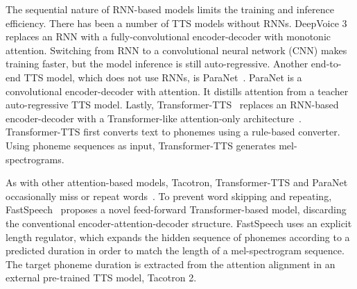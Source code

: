 The sequential nature of RNN-based models limits the training and inference efficiency. There has been a number of TTS models without RNNs. DeepVoice 3~\cite{deepvoice3} replaces an RNN with a fully-convolutional encoder-decoder with monotonic attention. Switching from RNN to a convolutional neural network (CNN) makes training faster, but the model inference is still auto-regressive. Another end-to-end TTS model, which does not use RNNs, is ParaNet~\cite{paranet}. ParaNet is a convolutional encoder-decoder with attention. It distills attention from a teacher auto-regressive TTS model. Lastly, Transformer-TTS~\cite{transformer-tts} replaces an RNN-based encoder-decoder with a Transformer-like  attention-only architecture~\cite{attention-is-all}. Transformer-TTS first converts text to phonemes using a rule-based converter. Using phoneme sequences as input, Transformer-TTS generates mel-spectrograms.  

As with other attention-based models, Tacotron, Transformer-TTS and ParaNet occasionally miss or repeat words~\cite{paranet}. To prevent word skipping and repeating, FastSpeech~\cite{fastspeech} proposes a novel feed-forward Transformer-based model, discarding the conventional encoder-attention-decoder structure. FastSpeech uses an explicit length regulator, which expands the hidden sequence of phonemes according to a predicted duration in order to match the length of a mel-spectrogram sequence. The target phoneme duration is extracted from the attention alignment in an external pre-trained TTS model, Tacotron 2.